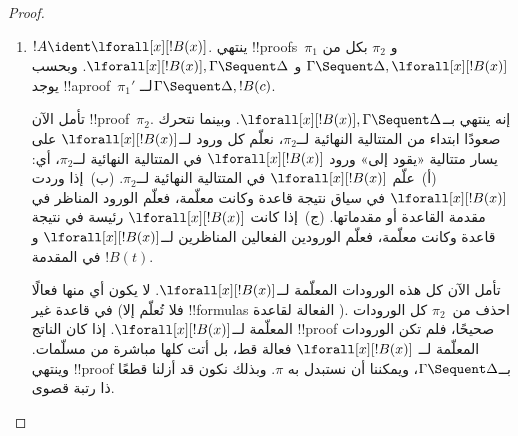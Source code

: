\documentclass[../../../include/open-logic-section]{subfiles}
\begin{document}
\begin{proof}
\begin{enumerate}
  $\pi_2''$ نحصل كذلك على !!a{proof}~$\pi_2'''$ لــ$!C, !B, \Gamma
  \Sequent \Delta$. ويكون !!{proof}~$\pi'$:
  \[
  \AxiomC{}
  \RightLabel{$\pi_2'$}
  \Deduce$\Gamma \fCenter \Delta, !B$
  \AxiomC{}
  \RightLabel{$\pi_1'$}
  \Deduce$!B, \Gamma \fCenter \Delta, !C$
  \AxiomC{}
  \RightLabel{$\pi_2'''$}
  \Deduce$!C, !B, \Gamma \fCenter \Delta$
  \RightLabel{\CutCS}
  \BinaryInf$!B, \Gamma \fCenter \Delta$
  \RightLabel{\CutCS}
  \BinaryInf$\Gamma \fCenter \Delta$
  \DisplayProof
  \]
  \item $!A \ident \lforall[x][!B(x)]$. ينتهي !!{proof}s~$\pi_1$ و
  $\pi_2$ بكل من $\Gamma \Sequent \Delta, \lforall[x][!B(x)]$ و
  $\lforall[x][!B(x)], \Gamma \Sequent \Delta$. وبحسب
   يوجد !!a{proof}~$\pi_1'$ لــ$\Gamma \Sequent
  \Delta, !B(c)$.

  تأمل الآن !!{proof}~$\pi_2$. إنه ينتهي بــ$\lforall[x][!B(x)],
  \Gamma \Sequent \Delta$. وبينما نتحرك صعودًا ابتداء من المتتالية النهائية
  لــ$\pi_2$، نعلّم كل ورود لــ$\lforall[x][!B(x)]$ على يسار متتالية «يقود
  إلى» ورود $\lforall[x][!B(x)]$ في المتتالية النهائية لــ$\pi_2$، أي:
  (أ)~علّم $\lforall[x][!B(x)]$ في المتتالية النهائية لــ$\pi_2$.
  (ب)~إذا وردت $\lforall[x][!B(x)]$ في سياق نتيجة قاعدة وكانت معلّمة،
  فعلّم الورود المناظر في مقدمة القاعدة أو مقدماتها. (ج)~إذا كانت
  $\lforall[x][!B(x)]$ رئيسة في نتيجة قاعدة \LeftR{\lforall} وكانت معلّمة،
  فعلّم الورودين الفعالين المناظرين لــ$\lforall[x][!B(x)]$ و$!B(t)$ في
  المقدمة.

  تأمل الآن كل هذه الورودات المعلّمة لــ$\lforall[x][!B(x)]$. لا يكون أي
  منها فعالًا في قاعدة غير \LeftR{\lforall} (فلا تُعلّم إلا !!{formula}s
  الفعالة لقاعدة \LeftR{\lforall}). احذف من~$\pi_2$ كل الورودات المعلّمة
  لــ$\lforall[x][!B(x)]$.
  إذا كان الناتج !!{proof} صحيحًا، فلم تكن الورودات المعلّمة لــ
  $\lforall[x][!B(x)]$ فعالة قط، بل أتت كلها مباشرة من مسلّمات. وينتهي
  !!{proof} بــ$\Gamma \Sequent \Delta$، ويمكننا أن نستبدل به $\pi$.
  وبذلك نكون قد أزلنا قطعًا ذا رتبة قصوى.


\end{enumerate}
\end{proof}
\end{document}

